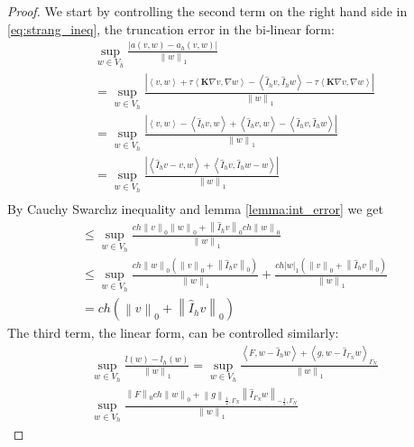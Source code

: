 \documentclass[../Main/main.tex]{subfiles}
\begin{document}
	\begin{proof}
		We start by controlling the second term on the right hand side in \eqref{eq:strang_ineq}, the truncation error in the bi-linear form:
		\begin{equation}
			\begin{gathered}
				\sup_{w\in V_h} \frac{|a(v,w)-a_h(v,w)|}{\left \|w \right \|_1} \\
				=\sup_{w\in V_h} \frac{|\left \langle v,w\right \rangle + \tau \left \langle \pmb{K} \nabla v,\nabla w \right \rangle - \left \langle \hat{I}_h v, \hat{I}_h w \right \rangle - \tau \left \langle \pmb{K} \nabla v, \nabla w \right \rangle|}{\left \| w \right \|_1} \\
				=\sup_{w\in V_h} \frac{|\left \langle v,w\right \rangle - \left \langle \hat{I}_h v, w \right \rangle + \left \langle \hat{I}_h v, w \right \rangle - \left \langle \hat{I}_h v, \hat{I}_h w \right \rangle|}{\left \| w \right \|_1}\\
				= \sup_{w\in V_h}\frac{|\left \langle \hat{I}_h v - v,w \right \rangle + \left \langle \hat{I}_h v, \hat{I}_h w - w \right \rangle |}{\left \| w \right \|_1} \\
			\end{gathered}
		\end{equation}
		By Cauchy Swarchz inequality and lemma \ref{lemma:int_error} we get
		\begin{equation}
			\begin{gathered}
				\leq \sup_{w\in V_h}\frac{ch\left \| v \right \|_0 \left \| w\right \|_0 + \left \|\hat{I}_h v\right \|_0 ch\left \|w\right \|_0}{\left \| w \right \|_1}\\
				\leq \sup_{w\in V_h}\frac{ch\left \|w\right \|_0(\left \|v\right \|_0 + \left \|\hat{I}_h v\right \|_0)}{\left \| w \right \|_1} + \frac{ch |w|_1(\left \|v\right \|_0 + \left \|\hat{I}_h v\right \|_0) }{\left \| w \right \|_1}\\
				=ch(\left \|v\right \|_0 + \left \|\hat{I}_h v\right \|_0)
			\end{gathered}
		\end{equation}
		The third term, the linear form, can be controlled similarly:
		\begin{equation}
			\begin{gathered}
				\sup_{w \in V_h} \frac{l(w)-l_h(w)}{\left \| w \right \|_1} = \sup_{w \in V_h} \frac{\left \langle F,w-\hat{I}_h w \right \rangle + \left \langle g,w-\hat{I}_{\Gamma_N} w \right \rangle_{\Gamma_N}}{\left \| w \right \|_1}\\
				\sup_{w \in V_h} \frac{\left \|F\right \|_0 ch\left \|w\right \|_0 + \left \|g\right \|_{\frac{1}{2},\Gamma_N}\left \|\hat{I}_{\Gamma_N}w\right \|_{-\frac{1}{2},\Gamma_N}}{\left \| w \right \|_1}
			\end{gathered}
		\end{equation}
	\end{proof}
\end{document}
